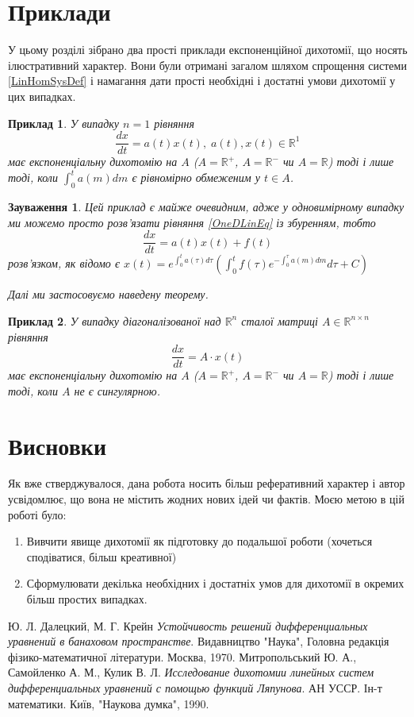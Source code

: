 \documentclass[14pt]{extarticle} %
\newtheorem{example}{\indent Приклад}[section]
\newtheorem{remark}{Зауваження}
\begin{document}
\section{Приклади}
У цьому розділі зібрано два прості приклади експоненційної дихотомії, що носять ілюстративний характер. Вони були отримані загалом шляхом
спрощення системи \ref{LinHomSysDef} і намагання дати прості необхідні і достатні умови дихотомії у цих випадках.
\begin{example}У випадку $n=1$ рівняння
	\[\frac{dx}{dt}=a(t)x(t),\; a(t),x(t)\in\mathbb{R}^1\tag{\#}\label{OneDLinEq}\]
	має експоненціальну дихотомію на $A$ ($A=\mathbb{R}^+$, $A=\mathbb{R}^-$ чи $A=\mathbb{R}$) тоді і лише тоді,
	коли $\int_0^t a(m)dm$ є рівномірно обмеженим у $t\in A$.
\end{example}
\begin{remark}
	Цей приклад є майже очевидним, адже у одновимірному випадку ми можемо просто розв’язати рівняння \ref{OneDLinEq}
	із збуренням, тобто
	\[\frac{dx}{dt}=a(t)x(t)+f(t)\]
	розв’язком, як відомо є $x(t)=e^{\int_0^ta(\tau)d\tau}(\int_0^tf(\tau)e^{-\int_0^{\tau}a(m)dm}d\tau+C)$

	Далі ми застосовуємо наведену теорему.
\end{remark}
\begin{example}У випадку діагоналізованої над $\mathbb{R}^n$ сталої матриці $A\in\mathbb{R}^{n\times n}$ рівняння
	\[\frac{dx}{dt}=A\cdot x(t)\]
	має експоненціальну дихотомію на $A$ ($A=\mathbb{R}^+$, $A=\mathbb{R}^-$ чи $A=\mathbb{R}$) тоді і лише тоді,
	коли $A$ не є сингулярною.
\end{example}
\section{Висновки}
Як вже стверджувалося, дана робота носить більш реферативний характер і автор усвідомлює, що вона не містить жодних нових ідей чи фактів.
Моєю метою в цій роботі було:
\begin{enumerate}
	\item{Вивчити явище дихотомії як підготовку до подальшої роботи (хочеться сподіватися, більш креативної)
		}
	\item{Сформулювати декілька необхідних і достатніх умов для дихотомії в окремих більш простих випадках.}
\end{enumerate}
\begin{thebibliography}{9}
Ю. Л. Далецкий, М. Г. Крейн
\emph{Устойчивость решений дифференциальных уравнений в банаховом пространстве}.
Видавництво "Наука"{}, Головна редакція фізико-математичної літератури. Москва, 1970.
Митропольський Ю. А., Самойленко А. М., Кулик В. Л.
\emph{Исследование дихотомии линейных систем дифференциальных уравнений с помощью функций Ляпунова}.
АН УССР. Ін-т математики. Київ, "Наукова думка", 1990.
\end{thebibliography}
\end{document}

